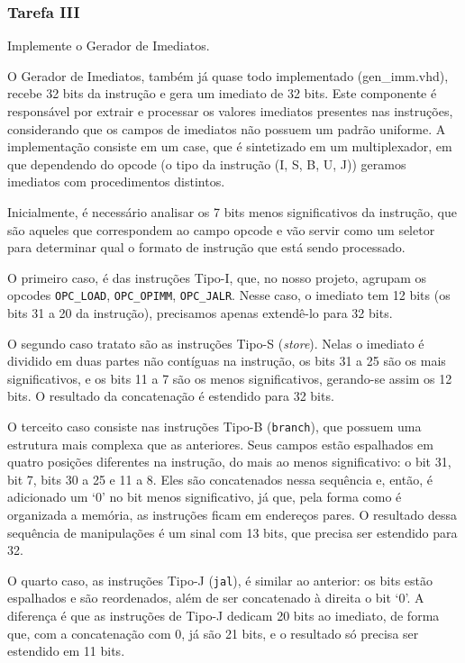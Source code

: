 \documentclass[a4paper,12pt]{article}
\newcommand{\cod}[1]{\texttt{#1}}
\begin{document}
\subsubsection{Tarefa III}
\begin{tcolorbox}[title=Enunciado, colback=blue!5!white, colframe=blue!75!black]
Implemente o Gerador de Imediatos. 
\end{tcolorbox}
O Gerador de Imediatos, também já quase todo implementado (gen\_imm.vhd), recebe 32 bits da instrução e gera um imediato de 32 bits. Este componente é responsável por extrair e processar os valores imediatos presentes nas instruções, considerando que os campos de imediatos não possuem um padrão uniforme. A implementação consiste em um case, que é sintetizado em um multiplexador, em que dependendo do opcode (o tipo da instrução (I, S, B, U, J)) geramos imediatos com procedimentos distintos.

Inicialmente, é necessário analisar os 7 bits menos significativos da instrução, que são aqueles que correspondem ao campo opcode e vão servir como um seletor para determinar qual o formato de instrução que está sendo processado.

O primeiro caso, é das instruções Tipo-I, que, no nosso projeto, agrupam os opcodes \cod{OPC\_LOAD}, \cod{OPC\_OPIMM}, \cod{OPC\_JALR}. Nesse caso, o imediato tem 12 bits (os bits 31 a 20 da instrução), precisamos apenas extendê-lo para 32 bits.

O segundo caso tratato são as instruções Tipo-S (\textit{store}). Nelas o imediato é dividido em duas partes não contíguas na instrução, os bits 31 a 25 são os mais significativos, e os bits 11 a 7 são os menos significativos, gerando-se assim os 12 bits. O resultado da concatenação é estendido para 32 bits.

O terceito caso consiste nas instruções Tipo-B (\cod{branch}), que possuem uma estrutura mais complexa que as anteriores. Seus campos estão espalhados em quatro posições diferentes na instrução, do mais ao menos significativo: o bit 31, bit 7, bits 30 a 25 e 11 a 8. Eles são concatenados nessa sequência e, então, é adicionado um `0' no bit menos significativo, já que, pela forma como é organizada a memória, as instruções ficam em endereços pares. O resultado dessa sequência de manipulações é um sinal com 13 bits, que precisa ser estendido para 32.

O quarto caso, as instruções Tipo-J (\cod{jal}), é similar ao anterior: os bits estão espalhados e são reordenados, além de ser concatenado à direita o bit `0'. A diferença é que as instruções de Tipo-J dedicam 20 bits ao imediato, de forma que, com a concatenação com 0, já são 21 bits, e o resultado só precisa ser estendido em 11 bits.
\end{document}

